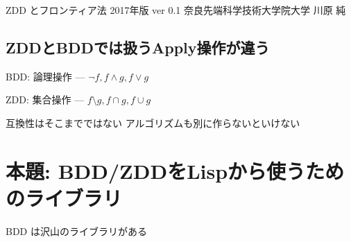 \begin{note}
ZDD とフロンティア法 2017年版 ver 0.1 奈良先端科学技術大学院大学 川原 純
\end{note}

\subsection{ZDDとBDDでは扱うApply操作が違う}
\label{sec-6-5}

BDD: 論理操作 --- $\neg f, f\land g, f\lor g$

ZDD: 集合操作 --- $f \setminus g, f\cap g, f\cup g$

互換性はそこまでではない アルゴリズムも別に作らないといけない

\section{本題: BDD/ZDDをLispから使うためのライブラリ}
\label{sec-7}

BDD は沢山のライブラリがある

